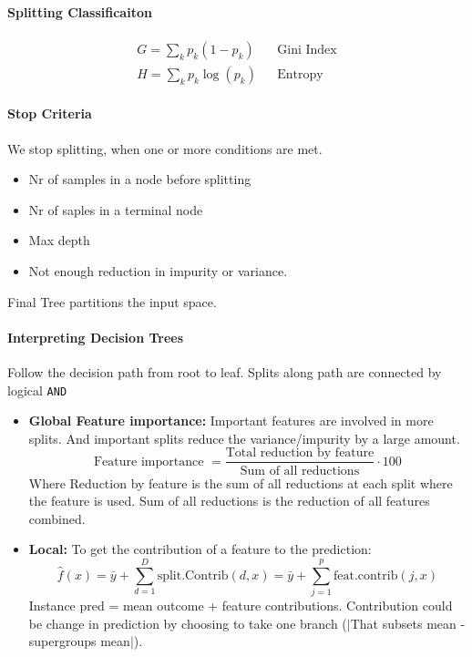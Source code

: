 \paragraph{Splitting Classificaiton}
\begin{align}
	G = \sum_{k} p_k(1-p_k)   &  & \text{Gini Index} \\
	H = \sum_{k} p_k\log(p_k) &  & \text{Entropy}
\end{align}

\paragraph{Stop Criteria}
We stop splitting, when one or more conditions are met.
\begin{itemize}
	\item Nr of samples in a node before splitting
	\item Nr of saples in a terminal node
	\item Max depth
	\item Not enough reduction in impurity or variance.
\end{itemize}
Final Tree partitions the input space.

\paragraph{Interpreting Decision Trees}
Follow the decision path from root to leaf. Splits along path are connected by logical \texttt{AND}
\begin{itemize}
	\item \textbf{Global Feature importance:} Important features are involved in more splits. And important splits reduce the variance/impurity by a large amount.
	      \begin{equation}
		      \text{Feature importance }= \frac{\text{Total reduction by feature}}{\text{Sum of all reductions}} \cdot 100
		      \label{eq:tree_importance}
	      \end{equation}
	      Where Reduction by feature is the sum of all reductions at each split where the feature is used. Sum of all reductions is the reduction of all features combined.
	\item \textbf{Local:} To get the contribution of a feature to the prediction:
	      \begin{equation}
		      \hat f(x) = \bar y + \sum_{d=1}^{D} \text{split.Contrib}(d,x) = \bar y + \sum_{j=1}^{p} \text{feat.contrib}(j, x)
		      \label{eq:local-tree-contribution}
	      \end{equation}
	      Instance pred =  mean outcome + feature contributions.
	      Contribution could be change in prediction by choosing to take one branch ($|$That subsets mean - supergroups mean$|$).
\end{itemize}

